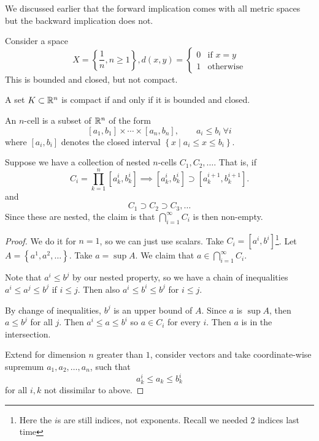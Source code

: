We discussed earlier that the forward implication comes with all metric spaces but the backward implication does not.
\begin{example}
    Consider a space
    \[X = \left\{ \frac{1}{n}, n\geq 1 \right\}, d(x, y) = \begin{cases}
            0 & \text{if }x = y  \\
            1 & \text{otherwise}
        \end{cases}\]
    This is bounded and closed, but not compact.
\end{example}

\begin{theorem}
    A set $K\subset \mathbb R^n$ is compact if and only if it is bounded and closed.
\end{theorem}
\begin{definition}[$n$-cell]
    An $n$-cell is a subset of $\mathbb R^n$ of the form
    \[[a_1, b_1]\times \cdots \times [a_n, b_n], \qquad a_i \leq b_i\ \forall i\]
    where $[a_i, b_i]$ denotes the closed interval $\left\{ x\mid a_i\leq x\leq b_i \right\}$.
\end{definition}

\begin{lemma}\label{lemma:hb-chain-lemma}
    Suppose we have a collection of nested $n$-cells $C_1, C_2, \dots$. That is, if
    \[C_i = \prod^n_{k=1}[a_k^i, b_k^i]\implies [a^i_k, b^i_k]\supset [a^{i+1}_k, b^{i+1}_k].\]
    and
    \[C_1 \supset C_2\supset C_3, \dots\]
    Since these are nested, the claim is that $\bigcap^\infty_{i = 1}C_i$ is then non-empty.
\end{lemma}
\begin{proof}
    We do it for $n = 1$, so we can just use scalars. Take $C_i = [a^i, b^i]$\footnote{Here the $i$s are still indices, not exponents. Recall we needed 2 indices last time}. Let $A = \left\{ a^1, a^2, \dots \right\}$. Take $a = \sup A$. We claim that $a\in \bigcap^\infty_{i=1}C_i$.

    Note that $a^i\leq b^j$ by our nested property, so we have a chain of inequalities $a^i \leq a^j \leq b^j$ if $i\leq j$. Then also $a^i \leq b^i\leq b^j$ for $i\leq j$.

    By change of inequalities, $b^j$ is an upper bound of $A$. Since $a$ is $\sup A$, then $a\leq b^j$ for all $j$. Then $a^i \leq a\leq b^i$ so $a\in C_i$ for every $i$. Then $a$ is in the intersection.

    Extend for dimension $n$ greater than $1$, consider vectors and take coordinate-wise supremum $a_1, a_2, \dots, a_n$, such that
    \[a^i_k \leq a_k \leq b^i_k\]
    for all $i, k$ not dissimilar to above.
\end{proof}

